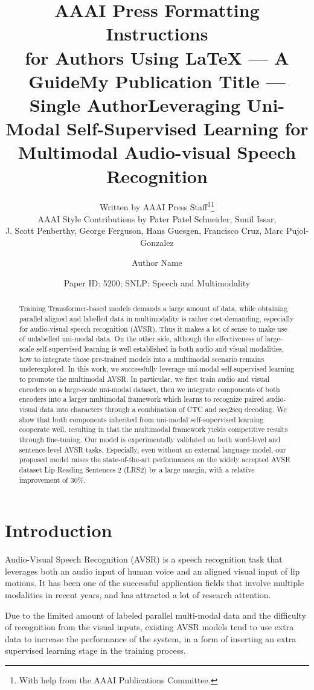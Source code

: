 \documentclass[letterpaper]{article} \usepackage{aaai22}  \usepackage{times}  \usepackage{helvet}  \usepackage{courier}  \usepackage[hyphens]{url}  \usepackage{graphicx} \urlstyle{rm} \def\UrlFont{\rm}  \usepackage{natbib}  \usepackage{caption} \usepackage{amsmath, xparse}
\title{AAAI Press Formatting Instructions \\for Authors Using \LaTeX{} --- A Guide}
\author{
Written by AAAI Press Staff\textsuperscript{\rm 1}\thanks{With help from the AAAI Publications Committee.}\\
    AAAI Style Contributions by Pater Patel Schneider,
    Sunil Issar,\\
    J. Scott Penberthy,
    George Ferguson,
    Hans Guesgen,
    Francisco Cruz\equalcontrib,
    Marc Pujol-Gonzalez\equalcontrib
}
\title{My Publication Title --- Single Author}
\author {
    Author Name
}
\title{Leveraging Uni-Modal Self-Supervised Learning for\\Multimodal Audio-visual Speech Recognition}
\author {
Paper ID: 5200; SNLP: Speech and Multimodality
}
\begin{document}
\maketitle

\begin{abstract}
Training Transformer-based models demands a large amount of data, while obtaining parallel aligned and labelled data in multimodality is rather cost-demanding, especially for audio-visual speech recognition (AVSR). Thus it makes a lot of sense to make use of unlabelled uni-modal data. On the other side, although the effectiveness of large-scale self-supervised learning is well established in both audio and visual modalities, how to integrate those pre-trained models into a multimodal scenario remains underexplored. 
In this work, we successfully leverage uni-modal self-supervised learning to promote the multimodal AVSR. 
In particular, we first train audio and visual encoders on a large-scale uni-modal dataset, then we integrate components of both encoders into a larger multimodal framework which learns to recognize paired audio-visual data into characters through a combination of CTC and seq2seq decoding. We show that both components inherited from uni-modal self-supervised learning cooperate well, resulting in that the multimodal framework yields competitive results through fine-tuning. Our model is experimentally validated on both word-level and sentence-level AVSR tasks. 
Especially, even without an external language model, our proposed model raises the state-of-the-art performances on the widely accepted AVSR dataset Lip Reading Sentences 2 (LRS2) by a large margin, with a relative improvement of 30\%.  



\end{abstract}

\section{Introduction}
Audio-Visual Speech Recognition (AVSR) is a speech recognition task that leverages both an audio input of human voice and an aligned visual input of lip motions. It has been one of the successful application fields that involve multiple modalities in recent years, and has attracted a lot of research attention. 

Due to the limited amount of labeled parallel multi-modal data and the difficulty of recognition from the visual inputs, existing AVSR models tend to use extra data to increase the performance of the system, in a form of inserting an extra supervised learning stage in the training process. 
\end{document}
